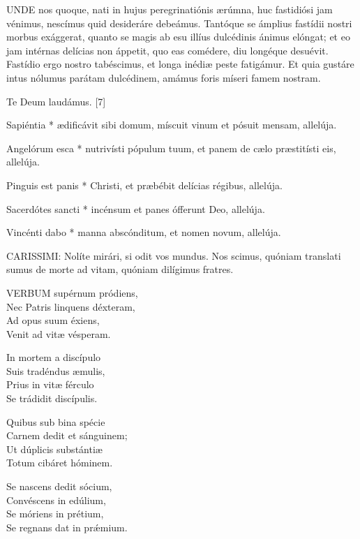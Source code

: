 \lettrine[lines=2]{U}{NDE} nos quoque, nati in hujus peregrinatiónis ærúmna, huc fastidiósi jam vénimus, nescímus quid desideráre debeámus. Tantóque se ámplius fastídii nostri morbus exággerat, quanto se magis ab esu illíus dulcédinis ánimus elóngat; et eo jam intérnas delícias non áppetit, quo eas comédere, diu longéque desuévit. Fastídio ergo nostro tabéscimus, et longa inédiæ peste fatigámur. Et quia gustáre intus nólumus parátam dulcédinem, amámus foris míseri famem nostram.

Te Deum laudámus. [7]


 Sapiéntia * ædificávit sibi domum, míscuit vinum et pósuit mensam, allelúja.


 Angelórum esca * nutrivísti pópulum tuum, et panem de cælo præstitísti eis, allelúja.

 Pinguis est panis * Christi, et præbébit delícias régibus, allelúja.

 Sacerdótes sancti * incénsum et panes ófferunt Deo, allelúja.

 Vincénti dabo * manna abscónditum, et nomen novum, allelúja.


\lettrine[lines=2]{C}{ARISSIMI}: Nolíte mirári, si odit vos mundus. Nos scimus, quóniam translati sumus de morte ad vitam, quóniam dilígimus fratres.


\lettrine[lines=2]{V}{ERBUM} supérnum pródiens,\\
Nec Patris linquens déxteram,\\
Ad opus suum éxiens,\\
Venit ad vitæ vésperam.

In mortem a discípulo\\
Suis tradéndus æmulis,\\
Prius in vitæ férculo\\
Se trádidit discípulis.

Quibus sub bina spécie\\
Carnem dedit et sánguinem;\\
Ut dúplicis substántiæ\\
Totum cibáret hóminem.

Se nascens dedit sócium,\\
Convéscens in edúlium,\\
Se móriens in prétium,\\
Se regnans dat in prǽmium.

